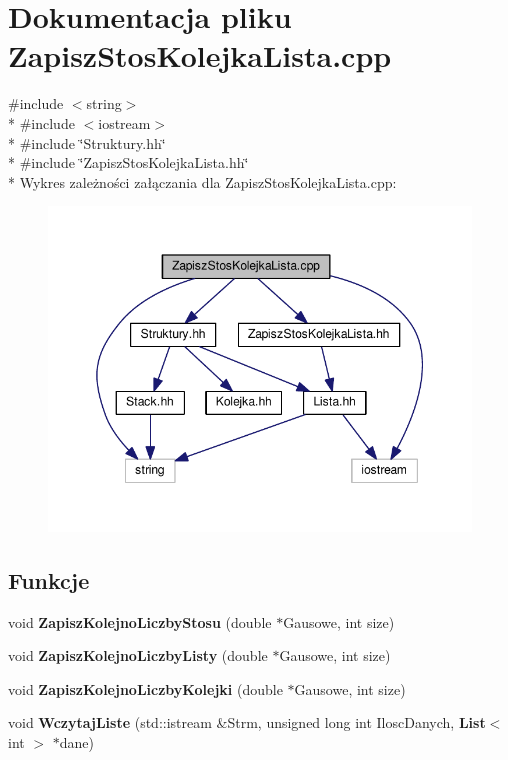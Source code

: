 \section{Dokumentacja pliku Zapisz\-Stos\-Kolejka\-Lista.\-cpp}
\label{_zapisz_stos_kolejka_lista_8cpp}
{\ttfamily \#include $<$string$>$}\\*
{\ttfamily \#include $<$iostream$>$}\\*
{\ttfamily \#include \char`\"{}Struktury.\-hh\char`\"{}}\\*
{\ttfamily \#include \char`\"{}Zapisz\-Stos\-Kolejka\-Lista.\-hh\char`\"{}}\\*
Wykres zależności załączania dla Zapisz\-Stos\-Kolejka\-Lista.\-cpp\-:\nopagebreak
\begin{figure}[H]
\begin{center}
\leavevmode
\includegraphics[width=349pt]{_zapisz_stos_kolejka_lista_8cpp__incl}
\end{center}
\end{figure}
\subsection*{Funkcje}
\begin{DoxyCompactItemize}
\item 
void {\bf Zapisz\-Kolejno\-Liczby\-Stosu} (double $\ast$Gausowe, int size)
\item 
void {\bf Zapisz\-Kolejno\-Liczby\-Listy} (double $\ast$Gausowe, int size)
\item 
void {\bf Zapisz\-Kolejno\-Liczby\-Kolejki} (double $\ast$Gausowe, int size)
\item 
void {\bf Wczytaj\-Liste} (std\-::istream \&Strm, unsigned long int Ilosc\-Danych, {\bf List}$<$ int $>$ $\ast$dane)
\end{DoxyCompactItemize}


